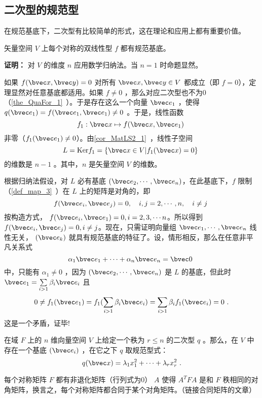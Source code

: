 
\subsection{二次型的规范型}
在规范基底下，二次型有比较简单的形式，这在理论和应用上都有重要价值。
\begin{theorem}{}\label{the_GuaOQu_1}
矢量空间 $V$ 上每个对称的双线性型 $f$ 都有规范基底。
\end{theorem}
\textbf{证明：} 对 $V$ 的维度 $n$ 应用数学归纳法。当 $n=1$ 时命题显然。

如果 $f(\bvec x,\bvec y)=0$ 对所有 $\bvec x,\bvec y\in V$ 都成立（即 $f=0$），定理显然对任意基底都适用。如果 $f\neq 0$ ，那么对应二次型也不为0（\autoref{the_QuaFor_1}~）。于是存在这么一个向量 $\bvec e_1$ ，使得 $q(\bvec e_1)=f(\bvec e_1,\bvec e_1)\neq0$ 。于是，线性函数
\begin{equation}
f_1:\bvec x\mapsto f(\bvec x,\bvec e_1)~
\end{equation}
非零（$f_1(\bvec e_1)\neq0$）。由\autoref{cor_MatLS2_1}~，线性子空间
\begin{equation}
L=\mathrm{Ker} f_1=\{\bvec x\in V|f_1(\bvec x)=0\}~
\end{equation}
的维数是 $n-1$ 。其中，$n$ 是矢量空间 $V$ 的维数。

根据归纳法假设，对 $L$ 必有基底 $(\bvec e_2,\cdots,\bvec e_n)$，在此基底下，$f$ 限制（\autoref{def_map_3}~）在 $L$ 上的矩阵是对角的，即 
\begin{equation}
f(\bvec e_i,\bvec e_j)=0,\quad i,j=2,\cdots ,n,\quad i\neq j~
\end{equation}
按构造方式， $f(\bvec e_i,\bvec e_1)=0,i=2,3,\cdots n$。所以得到 $f(\bvec e_i,\bvec e_j)=0,i\neq j$。现在，只需证明向量组 $\bvec e_1,\cdots,\bvec e_n$ 线性无关， $(\bvec e_k)$ 就具有规范基底的特征了。设，情形相反，那么在任意非平凡关系式
\begin{equation}
\alpha_1\bvec e_1+\cdots+\alpha_n\bvec e_n=\bvec 0~
\end{equation}
中，只能有 $\alpha_1\neq0$ ，因为 $(\bvec e_2,\cdots ,\bvec e_n)$ 是 $L$ 的基底，但此时 $\bvec e_1=\sum\limits_{i>1}\beta _i\bvec e_i$ 且
\begin{equation}
0\neq f_1(\bvec e_1)=f_1(\sum\limits_{i>1}\beta_i\bvec e_i)=\sum\limits_{i>1}\beta_if_1(\bvec e_i)=0~.
\end{equation}
这是一个矛盾，证毕!
\begin{corollary}{}
在域 $F$ 上的 $n$ 维向量空间 $V$ 上给定一个秩为 $r\leq n$ 的二次型 $q$ 。那么，在 $V$ 中存在一个基底 $(\bvec e_i)$ ，在它之下 $q$ 取规范型式：
\begin{equation}\label{eq_GuaOQu_1}
q(\bvec x)=\lambda_1 x_1^2+\cdots+\lambda_r x_r^2~.
\end{equation}

\end{corollary}
\begin{corollary}{}
每个对称矩阵 $F$ 都有非退化矩阵（行列式为0） $A$ 使得 $A^{T}FA$ 是和 $F$ 秩相同的对角矩阵，换言之，每个对称矩阵都合同于某个对角矩阵。（链接合同矩阵的文章） 
\end{corollary}
